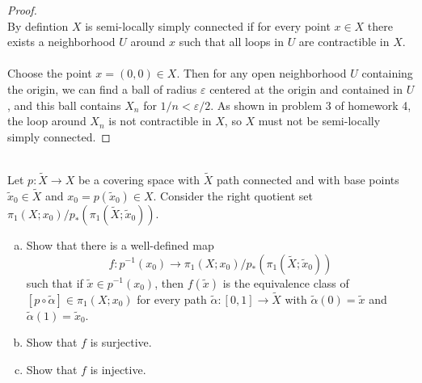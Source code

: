 \documentclass{article}
\newenvironment{problem}[2][Problem]{\begin{trivlist}
\item[\hskip \labelsep {\bfseries #1}\hskip \labelsep {\bfseries #2.}]}{\end{trivlist}}
\begin{document}
\begin{proof} \text{} \\
  By defintion $X$ is semi-locally simply connected if for every point $x \in X$
  there exists a neighborhood $U$ around $x$ such that all loops in $U$ are
  contractible in $X$.
  \\~\\
  Choose the point $x = (0, 0) \in X$. Then for any open neighborhood $U$
  containing the origin, we can find a ball of radius $\varepsilon$ centered at
  the origin and contained in $U$, and this ball contains $X_{n}$ for
  $1/n < \varepsilon/2$. As shown in problem 3 of homework 4, the loop around
  $X_{n}$ is not contractible in $X$, so $X$ must not be semi-locally simply
  connected.
\end{proof}
\pagebreak
\begin{problem}{4} \text{} \\
  Let $p\colon \widetilde X \rightarrow X$ be a covering space with
  $\widetilde X$ path connected and with base points
  $\widetilde x_0 \in \widetilde X$ and $x_0 = p(\widetilde x_0) \in X$.
  Consider the right quotient set
  $\pi_1(X; x_0)/p_*(\pi_1(\widetilde X; \widetilde x_0))$.
  \begin{enumerate}[a.]
    \item Show that there is a well-defined map \[
      f \colon
      p^{-1}(x_0) \rightarrow
      \pi_1(X; x_0)/p_*(\pi_1(\widetilde X; \widetilde x_0))
    \] such that if $\widetilde x \in p^{-1}(x_0)$, then $f(\widetilde x)$
    is the equivalence class of $[p \circ \widetilde \alpha] \in \pi_1(X; x_0)$
    for every path $\widetilde \alpha  \colon [0,1] \rightarrow \widetilde X$
    with $\widetilde \alpha(0) = \widetilde x$ and $\widetilde \alpha(1) = \widetilde x_0$.
    \item Show that $f$ is surjective.
    \item Show that $f$ is injective.
  \end{enumerate}
\end{problem}
\end{document}
